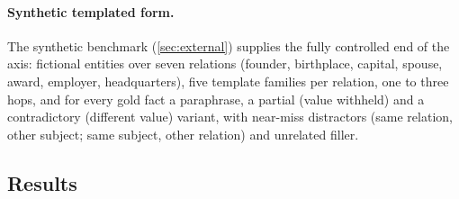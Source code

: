 \paragraph{Synthetic templated form.} The synthetic benchmark (\cref{sec:external}) supplies the fully controlled end of the axis: fictional entities over seven relations (founder, birthplace, capital, spouse, award, employer, headquarters), five template families per relation, one to three hops, and for every gold fact a paraphrase, a partial (value withheld) and a contradictory (different value) variant, with near-miss distractors (same relation, other subject; same subject, other relation) and unrelated filler.

\subsection{Results}
\label{app:estb-results}

\begin{table}[h]
\centering\scriptsize
\setlength{\tabcolsep}{2.5pt}
\resizebox{\linewidth}{!}{}
\caption{Retrieval-source and linguistic-form axes (Qwen2.5-7B, \musique{} 2-hop). Within-run probes on the document split, except the two fully retrieved runs (question split, too few questions for document components). \musique{} direction: transfer without retraining, scored only on questions outside the source probe's training split. Answered rate: the insufficient prompt unpatched, with the full sufficient anchor, and with only the probe-direction component; and the sufficient prompt with $\vdm$ projected to its insufficient value.}
\label{tab:estb}
\end{table}

